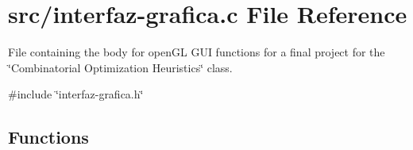 \hypertarget{interfaz-grafica_8c}{}\section{src/interfaz-\/grafica.c File Reference}
\label{interfaz-grafica_8c}


File containing the body for open\+GL G\+UI functions for a final project for the \char`\"{}\+Combinatorial Optimization Heuristics\char`\"{} class.  


{\ttfamily \#include \char`\"{}interfaz-\/grafica.\+h\char`\"{}}\newline
\subsection*{Functions}
